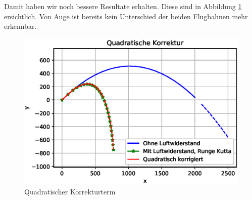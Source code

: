 Damit haben wir noch bessere Resultate erhalten. Diese sind in Abbildung \ref{naive_quadratic_term} ersichtlich. Von Auge ist bereits kein Unterschied der beiden Flugbahnen mehr erkennbar.
\begin{figure}
    \centering
    \includegraphics[scale = 0.7]{papers/perturbation/bilder/perturbation_fig2.eps}
    \caption{Quadratischer Korrekturterm}
	\label{naive_quadratic_term}
\end{figure}